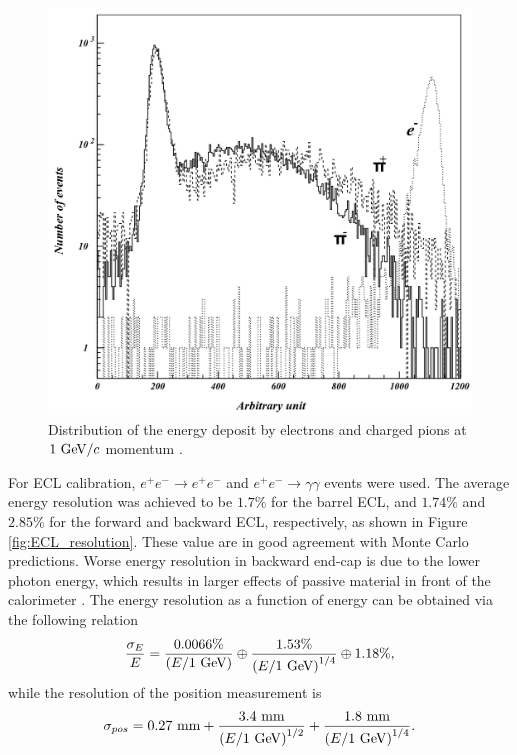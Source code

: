 \begin{figure}[!htb]
	\centering
	\captionsetup{width=0.8\linewidth}
	\includegraphics[width=0.6\linewidth]{fig/setup/ECL_deposit}
	\caption{Distribution of the energy deposit by electrons and charged pions at $1\mathrm{~GeV}/c$ momentum \cite{ABASHIAN2002117}.}
	\label{fig:ECL_deposit}
\end{figure}

For ECL calibration, $e^+e^- \to e^+e^-$ and $e^+e^- \to \gamma\gamma$ events were used. The average energy resolution was achieved to be $1.7\%$ for the barrel ECL, and $1.74\%$ and $2.85\%$ for the forward and backward ECL, respectively, as shown in Figure \ref{fig:ECL_resolution}. These value are in good agreement with Monte Carlo predictions. Worse energy resolution in backward end-cap is due to the lower photon energy, which results in larger effects of passive material in front of the calorimeter \cite{haba2004letter}. The energy resolution as a function of energy can be obtained via the following relation
\begin{equation}
\frac{\sigma_E}{E} = \frac{0.0066\%}{\left(E/1\mathrm{~GeV}\right)}\oplus\frac{1.53\%}{\left( E/1\mathrm{~GeV}\right)^{1/4}}\oplus 1.18\%,
\end{equation}
while the resolution of the position measurement is
\begin{equation}
\sigma_{pos} = 0.27\mathrm{~mm}+\frac{3.4\mathrm{~mm}}{\left( E/1\mathrm{~GeV}\right)^{1/2}} + \frac{1.8\mathrm{~mm}}{\left( E/1\mathrm{~GeV}\right)^{1/4}}.
\end{equation}

